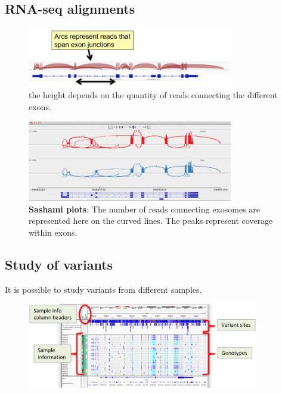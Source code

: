 \subsection{RNA-seq alignments}

\begin{figure}[H]
    \caption{the height depends on the quantity of reads connecting the different exons.}
    \centering
    \includegraphics[width=0.8\textwidth]{RNAseqAlign.PNG}
\end{figure}

\begin{figure}[H]
    \caption{\textbf{Sashami plots}: The number of reads connecting exosomes are
    represented here on the curved lines. The peaks represent coverage within
    exons.}
    \centering
    \includegraphics[width=0.8\textwidth]{sashamiplot.PNG}
\end{figure}

\subsection{Study of variants}
It is possible to study variants from different samples.

\begin{figure}[H]
    \centering
    \includegraphics[width=0.9\textwidth]{variantsView.PNG}
\end{figure}


